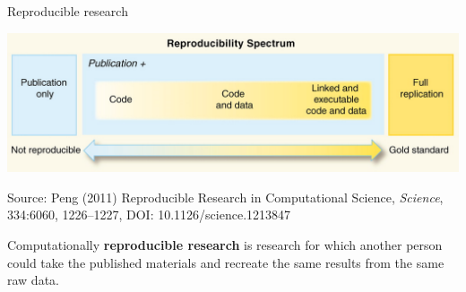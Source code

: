 \documentclass[ignorenonframetext,]{beamer}
\begin{document}
\begin{frame}{Reproducible research}
\protect\hypertarget{reproducible-research}{}

\begin{center}\includegraphics[width=\textwidth]{figures/peng_reproducible} \end{center}

\vspace{-0.4cm}

\scriptsize Source: Peng (2011) Reproducible Research in Computational
Science, \emph{Science}, 334:6060, 1226--1227, DOI:
10.1126/science.1213847

\bigskip

\normalsize Computationally \textbf{reproducible research} is research
for which another person could take the published materials and recreate
the same results from the same raw data.

\end{frame}
\end{document}
